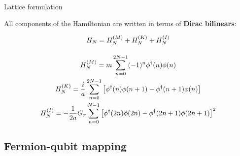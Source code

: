 \documentclass[9pt, handout, aspectratio=169]{beamer}	%
\begin{document}
\begin{frame}[allowframebreaks]{Lattice formulation}
\begin{figure}[!tbp]
\begin{minipage}[c]{.45\linewidth}
		\end{minipage}
	\end{figure}

\break

	All components of the Hamiltonian are written in terms of \textbf{Dirac bilinears}:

	\vspace{1em}

	\begin{gather*}
	  H_{N} = H_{N}^{(M)} + H_{N}^{(K)} + H_{N}^{(I)}
	    \label{eq:NJL1-staggered-discretization} \\[10pt]
	  H_{N}^{(M)} =
	    m \sum_{n=0}^{2N-1} (-1)^{n}\phi^{\dagger}(n)\phi(n) \\
	  H_{N}^{(K)} =
	    \frac{i}{a} \sum_{n=0}^{2N-1} \qty[
	    \phi^{\dagger}(n)\phi(n+1) - \phi^{\dagger}(n+1)\phi(n)] \\
	  H_{N}^{(I)} =
	    - \frac{1}{2a} G_{\pi} \sum_{n=0}^{N-1} \qty[
	      \phi^{\dagger}(2n)\phi(2n) - \phi^{\dagger}(2n+1)\phi(2n+1)
	    ]^{2}
	\end{gather*}

\end{frame}


\subsection{Fermion-qubit mapping}
\end{document}
